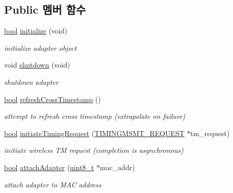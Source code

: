 \subsection*{Public 멤버 함수}
\begin{DoxyCompactItemize}
\item 
\hyperlink{avb__gptp_8h_af6a258d8f3ee5206d682d799316314b1}{bool} \hyperlink{class_intel_wireless_adapter_a3d0e1a699a860d383f8f5d031e923fee}{initialize} (void)
\begin{DoxyCompactList}\small\item\em initialize adapter object \end{DoxyCompactList}\item 
void \hyperlink{class_intel_wireless_adapter_a1c9d5e29ad8899afe0c34571ddee18f9}{shutdown} (void)
\begin{DoxyCompactList}\small\item\em shutdown adapter \end{DoxyCompactList}\item 
\hyperlink{avb__gptp_8h_af6a258d8f3ee5206d682d799316314b1}{bool} \hyperlink{class_intel_wireless_adapter_a3541350ebdc6cf554f132e7991d5d39f}{refresh\+Cross\+Timestamp} ()
\begin{DoxyCompactList}\small\item\em attempt to refresh cross timestamp (extrapolate on failure) \end{DoxyCompactList}\item 
\hyperlink{avb__gptp_8h_af6a258d8f3ee5206d682d799316314b1}{bool} \hyperlink{class_intel_wireless_adapter_af37854fbd1bc7c7d9f24939df96ff393}{initiate\+Timing\+Request} (\hyperlink{wireless__tstamper_8hpp_a5830b5c9301af6c6ba8f730db5a4b571}{T\+I\+M\+I\+N\+G\+M\+S\+M\+T\+\_\+\+R\+E\+Q\+U\+E\+ST} $\ast$tm\+\_\+request)
\begin{DoxyCompactList}\small\item\em initiate wireless TM request (completion is asynchronous) \end{DoxyCompactList}\item 
\hyperlink{avb__gptp_8h_af6a258d8f3ee5206d682d799316314b1}{bool} \hyperlink{class_intel_wireless_adapter_a2c1e130d0e11ba5e71be80250741302d}{attach\+Adapter} (\hyperlink{stdint_8h_aba7bc1797add20fe3efdf37ced1182c5}{uint8\+\_\+t} $\ast$mac\+\_\+addr)
\begin{DoxyCompactList}\small\item\em attach adapter to M\+AC address \end{DoxyCompactList}\item 

\end{DoxyCompactItemize}
